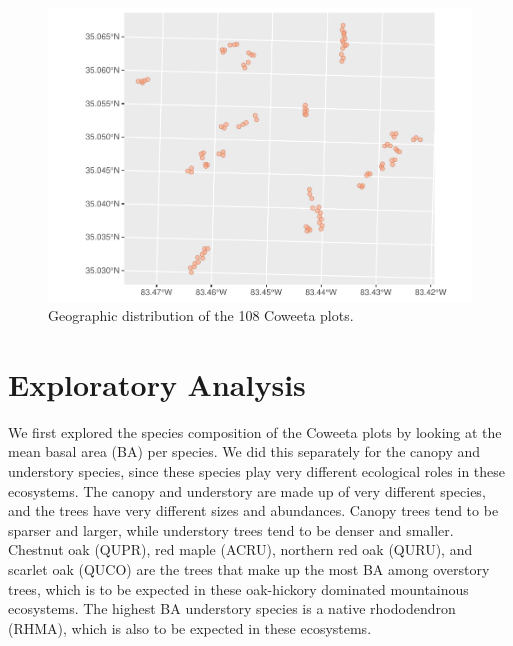 \documentclass[
  12pt,
]{article}
\begin{document}
\begin{figure}
\centering
\includegraphics{ProjectDraft_files/figure-latex/unnamed-chunk-1-1.pdf}
\caption{Geographic distribution of the 108 Coweeta plots.}
\end{figure}

\newpage

\hypertarget{exploratory-analysis}{%
\section{Exploratory Analysis}\label{exploratory-analysis}}

We first explored the species composition of the Coweeta plots by
looking at the mean basal area (BA) per species. We did this separately
for the canopy and understory species, since these species play very
different ecological roles in these ecosystems. The canopy and
understory are made up of very different species, and the trees have
very different sizes and abundances. Canopy trees tend to be sparser and
larger, while understory trees tend to be denser and smaller. Chestnut
oak (QUPR), red maple (ACRU), northern red oak (QURU), and scarlet oak
(QUCO) are the trees that make up the most BA among overstory trees,
which is to be expected in these oak-hickory dominated mountainous
ecosystems. The highest BA understory species is a native rhododendron
(RHMA), which is also to be expected in these ecosystems.
\end{document}
